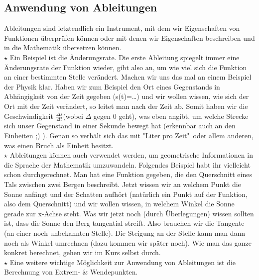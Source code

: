 \subsection{Anwendung von Ableitungen}
	Ableitungen sind letztendlich ein Instrument, mit dem wir Eigenschaften von
	Funktionen überprüfen können oder mit denen wir Eigenschaften beschreiben und
	in die Mathematik übersetzen können.\\
	
	\(\star\) Ein Beispiel ist die Änderungsrate. Die erste Ableitung spiegelt
	immer eine Änderungsrate der Funktion wieder, gibt also an, um wie viel sich
	die Funktion an einer bestimmten Stelle verändert.
	Machen wir uns das mal an einem Beispiel der Physik klar. Haben wir zum
	Beispiel den Ort eines Gegenstands in Abhängigkeit von der Zeit gegeben
	(s(t)=\ldots) und wir wollen wissen, wie sich der Ort mit der Zeit verändert,
	so leitet man nach der Zeit ab. Somit haben wir die Geschwindigkeit
	\(\frac{\Delta s}{\Delta t}\)(wobei \(\Delta\) gegen 0 geht), was eben angibt,
	um welche Strecke sich unser Gegenstand in einer Sekunde bewegt hat (erkennbar
	auch an den Einheiten ;) ). Genau so verhält sich das mit "Liter pro Zeit"\
	oder allem anderen, was einen Bruch als Einheit besitzt.\\

	\(\star\) Ableitungen können auch verwendet werden, um geometrische
	Informationen in die Sprache der Mathematik umzuwandeln. Folgendes Beispiel
	habt ihr vielleicht schon durchgerechnet. Man hat eine Funktion gegeben, die
	den Querschnitt eines Tals zwischen zwei Bergen beschreibt. Jetzt wissen wir an
	welchem Punkt die Sonne anfängt und der Schatten aufhört (natürlich ein Punkt
	auf der Funktion, also dem Querschnitt) und wir wollen wissen, in welchem
	Winkel die Sonne gerade zur x-Achse steht. Was wir jetzt noch (durch
	Überlegungen) wissen sollten ist, dass die Sonne den Berg tangential streift.
	Also brauchen wir die Tangente (an einer noch unbekannten Stelle). Die Steigung
	an der Stelle kann man dann noch als Winkel umrechnen (dazu kommen wir später
	noch). Wie man das ganze konkret berechnet, gehen wir im Kurs selbst durch.\\

	\(\star\) Eine weitere wichtige Möglichkeit zur Anwendung von Ableitungen ist
	die Berechnung von Extrem- \& Wendepunkten.
	
	
